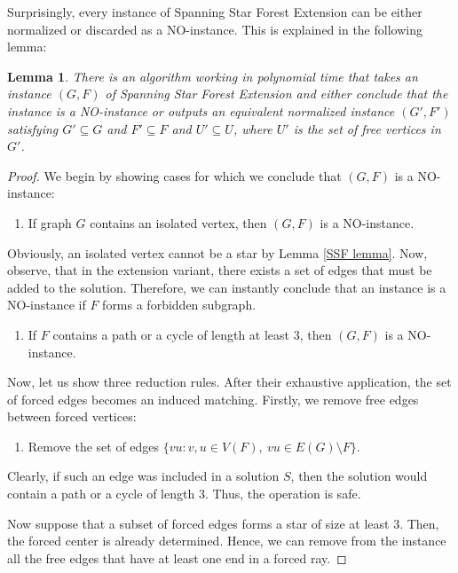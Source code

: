 \documentclass[en]{pracamgr}
\newtheorem{lemma}{Lemma}
\theoremstyle{definition}
\newcommand{\ssfep}{{\sc Spanning Star Forest Extension}}
\begin{document}
Surprisingly, every instance of \ssfep{} can be either normalized or discarded as a NO-instance. This is explained in the following lemma:

\begin{lemma}
	There is an algorithm working in polynomial time that takes an instance $(G,F)$ of \ssfep{} and either conclude that the instance is a NO-instance or outputs an equivalent normalized instance $(G',F')$ satisfying $G' \subseteq G$ and $F' \subseteq F$ and $U' \subseteq U$, where $U'$ is the set of free vertices in $G'$.
\end{lemma}

\begin{proof}
	We begin by showing cases for which we conclude that $(G,F)$ is a NO-instance:
	\begin{enumerate}[leftmargin=*,label=\textbf{Reduction \arabic{enumi}},labelindent=0pt]
		\item If graph $G$ contains an isolated vertex, then $(G,F)$ is a NO-instance.
	\end{enumerate}
	
	Obviously, an isolated vertex cannot be a star by Lemma \ref{SSF lemma}. Now, observe, that in the extension variant, there exists a set of edges that must be added to the solution. Therefore, we can instantly conclude that an instance is a NO-instance if $F$ forms a forbidden subgraph.
	
	\begin{enumerate}[leftmargin=*,label=\textbf{Reduction \arabic{enumi}},labelindent=0pt,resume]
		\item If $F$ contains a path or a cycle of length at least $3$, then $(G,F)$ is a NO-instance.
	\end{enumerate}
	
	Now, let us show three reduction rules. After their exhaustive application, the set of forced edges becomes an induced matching. Firstly, we remove free edges between forced vertices:	

	\begin{enumerate}[leftmargin=*,label=\textbf{Reduction \arabic{enumi}},labelindent=0pt,resume]
		\item Remove the set of edges $\{vu: v,u \in V(F),\ vu \in E(G) \setminus F\}$.
	\end{enumerate}
	Clearly, if such an edge was included in a solution $S$, then the solution would contain a path or a cycle of length $3$. Thus, the operation is safe. 
	
	Now suppose that a subset of forced edges forms a star of size at least $3$. Then, the forced center is already determined. Hence, we can remove from the instance all the free edges that have at least one end in a forced ray. 
	

\end{proof}
\end{document}
